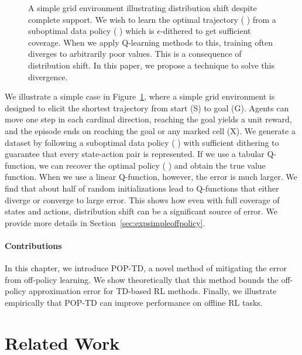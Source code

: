 \begin{figure}[t]
  \centering
  
  \caption{A simple grid environment illustrating distribution shift despite complete support. We wish to learn the optimal trajectory ({\color{optimpolicy} \optimpolicyglyph}) from a suboptimal data policy ({\color{datapolicy} \datapolicyglyph}) which is $\epsilon$-dithered to get sufficient coverage. When we apply Q-learning methods to this, training often diverges to arbitrarily poor values. This is a consequence of distribution shift. In this paper, we propose a technique to solve this divergence. }
  \label{fig:sopmap}
\end{figure}

We illustrate a simple case in Figure~\ref{fig:sopmap}, where a simple grid environment is designed to elicit the shortest trajectory from start (S) to goal (G). Agents can move one step in each cardinal direction, reaching the goal yields a unit reward, and the episode ends on reaching the goal or any marked cell (X). We generate a dataset by following a suboptimal data policy ({\color{datapolicy} \datapolicyglyph}) with sufficient dithering to guarantee that every state-action pair is represented. If we use a tabular Q-function, we can recover the optimal policy ({\color{optimpolicy} \optimpolicyglyph}) and obtain the true value function. When we use a linear Q-function, however, the error is much larger. We find that about half of random initializations lead to Q-functions that either diverge or converge to large error. This shows how even with full coverage of states and actions, distribution shift can be a significant source of error. We provide more details in Section~\ref{sec:expsimpleoffpolicy}.

\paragraph{Contributions}
In this chapter, we introduce POP-TD, a novel method of mitigating the error from off-policy learning. We show theoretically that this method bounds the off-policy approximation error for TD-based RL methods. Finally, we illustrate empirically that POP-TD can improve performance on offline RL tasks.

\section{Related Work}

